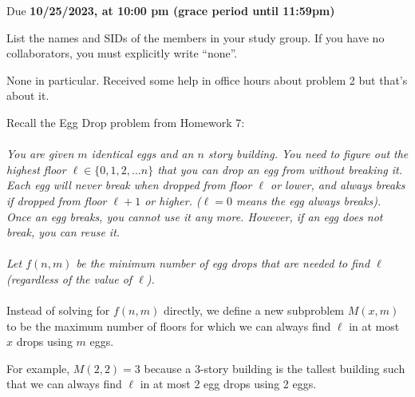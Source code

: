 \documentclass[11pt]{article}
\def\duedate{10/25/2023, at 10:00 pm (grace period until 11:59pm)}
\begin{document}
\maketitle

Due \textbf{\duedate}


List the names and SIDs of the members in your study group.
If you have no collaborators, you must explicitly write ``none''.

\begin{solution}
	None in particular. Received some help in office hours about problem 2 but that's about it.
\end{solution}

\newpage


Recall the Egg Drop problem from Homework 7:
\\\\
\textit{You are given $m$ identical eggs and an $n$ story
building. You need to figure out the highest floor
$\ell \in \{0, 1, 2, \ldots n\}$ that you can drop an egg from without
breaking it. Each egg will never break when dropped from floor $\ell$ or lower, and always breaks if dropped from floor $\ell+1$ or higher. ($\ell = 0$ means the egg always breaks). Once an egg breaks, you cannot use it any more. However, if an egg does not break, you can reuse it.
\\\\
Let $f(n, m)$ be the minimum number of egg drops that are needed to find $\ell$ (regardless of the value of $\ell$).}
\\\\
Instead of solving for $f(n, m)$ directly, we define a new subproblem $M(x, m)$ to be the maximum number of floors for which we can always find $\ell$ in at most $x$ drops using $m$ eggs. 

For example, $M(2, 2) = 3$ because a 3-story building is the tallest building such that we can always find $\ell$ in at most 2 egg drops using 2 eggs.
\end{document}
